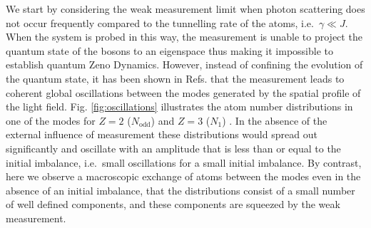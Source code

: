 We start by considering the weak measurement limit when photon
scattering does not occur frequently compared to the tunnelling rate
of the atoms, i.e.~$\gamma \ll J$. When the system is probed in this
way, the measurement is unable to project the quantum state of the
bosons to an eigenspace thus making it impossible to establish quantum
Zeno Dynamics. However, instead of confining the evolution of the
quantum state, it has been shown in Refs. \cite{mazzucchi2016,
  mazzucchi2016njp} that the measurement leads to coherent global
oscillations between the modes generated by the spatial profile of the
light field. Fig. \ref{fig:oscillations} illustrates the atom number
distributions in one of the modes for $Z = 2$ ($N_\mathrm{odd}$) and
$Z = 3$ ($N_1$) \cite{mazzucchi2016}. In the absence of the external
influence of measurement these distributions would spread out
significantly and oscillate with an amplitude that is less than or
equal to the initial imbalance, i.e.~small oscillations for a small
initial imbalance. By contrast, here we observe a macroscopic exchange
of atoms between the modes even in the absence of an initial
imbalance, that the distributions consist of a small number of well
defined components, and these components are squeezed by the weak
measurement.

